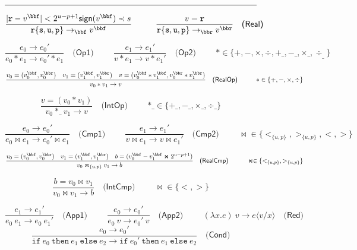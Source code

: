
\begin{figure}[tb]
\hrule
\vspace{0.1cm}
$$
\frac{|\mathtt{r}-v^\bbf|< 2^{u-p+1} \mathsf{sign}(v^\bbf)\prec s}
     {\mathtt{r\{s,u,p\} } \rightarrow_\bbf v^\bbf}
\hspace{1cm}
\frac{v=\mathtt{r}}
     {\mathtt{r\{s,u,p\} } \rightarrow_\bbr v^\bbr}\quad\textsf{(Real)}
$$

$$
\frac{e_0 \rightarrow e_0'}
     {e_0\ast e_1 \rightarrow e_0'\ast e_1}\quad\textsf{(Op1)}
\hspace{1cm}
\frac{e_1 \rightarrow e_1'}
     {v\ast e_1 \rightarrow v\ast  e_1'}\quad\textsf{(Op2)}\hspace{1cm}\ast\in\{+,-,\times,\div,+\_,-\_,\times\_,\div_\_\}
$$


$$
\frac{v_0=(v_0^\bbf,v_0^\bbr) \quad v_1=(v_1^\bbf,v_1^\bbr)\quad v=(v_0^\bbf\ast v_1^\bbf,v_0^\bbr\ast v_1^\bbr)
}
     {v_0\ast v_1 \rightarrow v}\quad\textsf{(RealOp)}\hspace{1cm}\ast\in\{+,-,\times,\div\}
$$

$$
\frac{v=(v_0\ast v_1)}
     {v_0\ {\ast\_}\ v_1 \rightarrow v}\quad\textsf{(IntOp)}\hspace{1cm}{\ast\_}\in\{+\_,-\_,\times\_,\div\_\}
$$


$$
\frac{e_0 \rightarrow e_0'}
     {e_0\Join e_1 \rightarrow e_0'\Join e_1}\quad\textsf{(Cmp1)}
\hspace{1cm}
\frac{e_1 \rightarrow e_1'}
     {v\Join e_1 \rightarrow v\Join e_1'}\quad\textsf{(Cmp2)}
\hspace{1cm}\Join\in\{<_{\{u,p\}},>_{\{u,p\}},<,>\}
$$


$$
\frac{v_0=(v_0^\bbf,v_0^\bbr) \quad v_1=(v_1^\bbf,v_1^\bbr)\quad b=(v_0^\bbf- v_1^\bbf\Join 2^{u-p+1})
}
     {v_0\Join_{\{u,p\}} v_1 \rightarrow b}\quad\textsf{(RealCmp)}
\hspace{1cm}\Join\in\{<_{\{u,p\}},>_{\{u,p\}}\}
$$

$$
\frac{b=v_0\Join v_1}
     {v_0\Join v_1 \rightarrow b}\quad\textsf{(IntCmp)}
\hspace{1cm}\Join\in\{<,>\}
$$


$$
\frac{e_1 \rightarrow e_1'}
     {e_0\ e_1 \rightarrow e_0\ e_1'}\quad\textsf{(App1)}
\hspace{1cm}
\frac{e_0 \rightarrow e_0'}
     {e_0\ v \rightarrow e_0'\ v}\quad\textsf{(App2)}
\hspace{1cm}
     {(\lambda x.e)\ v\rightarrow e\langle v/x\rangle}\quad\textsf{(Red)}
$$
$$
\frac{e_0 \rightarrow e_0'}
     {\mathtt{if}\ e_0\ \mathtt{then}\ e_1\ \mathtt{else}\ e_2
      \rightarrow \mathtt{if}\ e_0'\ \mathtt{then}\ e_1\ \mathtt{else}\ e_2
     }\quad\textsf{(Cond)}
$$


\end{figure}
